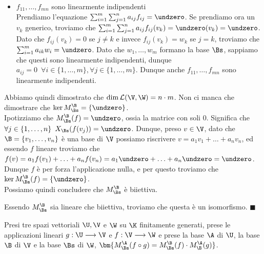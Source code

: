 \documentclass[11pt, a4paper, titlepage, oneside]{scrbook}
\begin{document}
\begin{enumerate}[label=\arabic*°]
\begin{itemize}
        Abbiamo visto prima che $f_{ij}(v_k) = \undzero$ se $j \neq k$, dunque troviamo che \mbox{$g(v_k) = \sum_{i = 1}^m \sum_{j = 1}^n  a_{ij} f_{ij}(v_k) = \sum_{i = 1}^m a_{ik} f_{ik}(v_k) = \sum_{i = 1}^m a_{ik} w_i = f(v_k)$}, questo perché $f_{ik}(v_k) = w_k$. Quindi $\forall k \in \{1, \ldots, n\} \enspace g(v_k) = f(v_k)$. Per il lemma II) visto in Proposizione \ref{lemmi-matrici-e-app-lin}, troviamo che $g = f$.
        \item $f_{11}, \ldots, f_{mn}$ sono linearmente indipendenti \\
        Prendiamo l'equazione $\sum_{i = 1}^m \sum_{j = 1}^n a_{ij} f_{ij} = \undzero$. Se prendiamo ora un $v_k$ generico, troviamo che $\sum_{i = 1}^m \sum_{j = 1}^n a_{ij} f_{ij}(v_k) = \undzero(v_k) = \undzero$. Dato che $f_{ij}(v_k) = 0$ se $j \neq k$ e invece $f_{ij}(v_k) = w_k$ se $j = k$, troviamo che $\sum_{i = 1}^m a_{ik} w_i = \undzero$. Dato che $w_1, \ldots, w_m$ formano la base $\Bs$, sappiamo che questi sono linearmente indipendenti, dunque $a_{ij} = 0 \enspace \forall i \in \{1, \ldots, m\}, \forall j \in \{1, \ldots, m\}$. Dunque anche $f_{11}, \ldots, f_{mn}$ sono linearmente indipendenti. 
    \end{itemize}
    Abbiamo quindi dimostrato che $\dim \mathcal{L}(\V, \W) = n \cdot m$. Non ci manca che dimostrare che $\ker M_\Bs^\B = \{\undzero\}$. \\
    Ipotizziamo che $M_\Bs^\B(f) = \undzero$, ossia la matrice con soli $0$. Significa che $\forall j \in \{1, \ldots, n\} \enspace X_\Bs(f(v_j)) = \undzero$. Dunque, preso $v \in \V$, dato che $\B = \{v_1, \ldots, v_n\}$ è una base di $\V$ possiamo riscrivere $v = a_1 v_1 + \ldots + a_n v_n$, ed essendo $f$ lineare troviamo che $f(v) = a_1 f(v_1) + \ldots + a_n f(v_n) = a_1 \undzero + \ldots + a_n \undzero = \undzero$. Dunque $f$ è per forza l'applicazione nulla, e per questo troviamo che $\ker M_\Bs^\B(f) = \{\undzero\}$.\\
    Possiamo quindi concludere che $M_\Bs^\B$ è biiettiva.   
\end{enumerate}
Essendo $M_\Bs^\B$ sia lineare che biiettiva, troviamo che questa è un isomorfismo. $\blacksquare$

\begin{Proposizione}[]
\label{propos-matrice-associata-composizione}
Presi tre spazi vettoriali $\U, \V$ e $\W$ su $\K$ finitamente generati, prese le applicazioni lineari $g: \U \longrightarrow \V$ e $f: \V \longrightarrow \W$ e prese la base $\A$ di $\U$, la base $\B$ di $\V$ e la base $\Bs$ di $\W$, \mbox{$\bm{M_\Bs^\A(f \circ g) = M_\Bs^\B(f) \cdot M_\B^\A(g)}$}.
\end{Proposizione}
\end{document}
